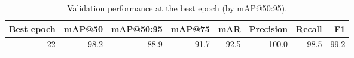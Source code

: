 \begin{table}
\caption{Validation performance at the best epoch (by mAP@50:95).}
\label{tab:rfdetr_results}
\begin{tabular}{rrrrrrrr}
\toprule
Best epoch & mAP@50 & mAP@50:95 & mAP@75 & mAR & Precision & Recall & F1 \\
\midrule
22 & 98.2 & 88.9 & 91.7 & 92.5 & 100.0 & 98.5 & 99.2 \\
\bottomrule
\end{tabular}
\end{table}
